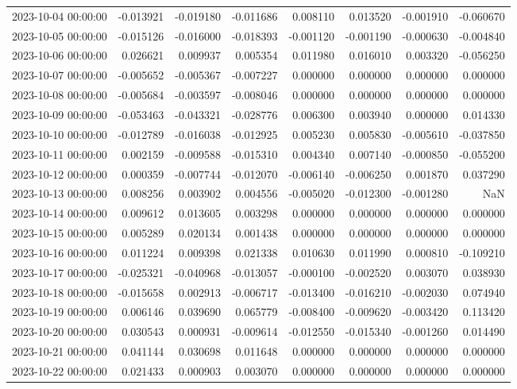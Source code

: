\begin{tabular}{lrrrrrrr}
2023-10-04 00:00:00 & -0.013921 & -0.019180 & -0.011686 & 0.008110 & 0.013520 & -0.001910 & -0.060670 \\
2023-10-05 00:00:00 & -0.015126 & -0.016000 & -0.018393 & -0.001120 & -0.001190 & -0.000630 & -0.004840 \\
2023-10-06 00:00:00 & 0.026621 & 0.009937 & 0.005354 & 0.011980 & 0.016010 & 0.003320 & -0.056250 \\
2023-10-07 00:00:00 & -0.005652 & -0.005367 & -0.007227 & 0.000000 & 0.000000 & 0.000000 & 0.000000 \\
2023-10-08 00:00:00 & -0.005684 & -0.003597 & -0.008046 & 0.000000 & 0.000000 & 0.000000 & 0.000000 \\
2023-10-09 00:00:00 & -0.053463 & -0.043321 & -0.028776 & 0.006300 & 0.003940 & 0.000000 & 0.014330 \\
2023-10-10 00:00:00 & -0.012789 & -0.016038 & -0.012925 & 0.005230 & 0.005830 & -0.005610 & -0.037850 \\
2023-10-11 00:00:00 & 0.002159 & -0.009588 & -0.015310 & 0.004340 & 0.007140 & -0.000850 & -0.055200 \\
2023-10-12 00:00:00 & 0.000359 & -0.007744 & -0.012070 & -0.006140 & -0.006250 & 0.001870 & 0.037290 \\
2023-10-13 00:00:00 & 0.008256 & 0.003902 & 0.004556 & -0.005020 & -0.012300 & -0.001280 & NaN \\
2023-10-14 00:00:00 & 0.009612 & 0.013605 & 0.003298 & 0.000000 & 0.000000 & 0.000000 & 0.000000 \\
2023-10-15 00:00:00 & 0.005289 & 0.020134 & 0.001438 & 0.000000 & 0.000000 & 0.000000 & 0.000000 \\
2023-10-16 00:00:00 & 0.011224 & 0.009398 & 0.021338 & 0.010630 & 0.011990 & 0.000810 & -0.109210 \\
2023-10-17 00:00:00 & -0.025321 & -0.040968 & -0.013057 & -0.000100 & -0.002520 & 0.003070 & 0.038930 \\
2023-10-18 00:00:00 & -0.015658 & 0.002913 & -0.006717 & -0.013400 & -0.016210 & -0.002030 & 0.074940 \\
2023-10-19 00:00:00 & 0.006146 & 0.039690 & 0.065779 & -0.008400 & -0.009620 & -0.003420 & 0.113420 \\
2023-10-20 00:00:00 & 0.030543 & 0.000931 & -0.009614 & -0.012550 & -0.015340 & -0.001260 & 0.014490 \\
2023-10-21 00:00:00 & 0.041144 & 0.030698 & 0.011648 & 0.000000 & 0.000000 & 0.000000 & 0.000000 \\
2023-10-22 00:00:00 & 0.021433 & 0.000903 & 0.003070 & 0.000000 & 0.000000 & 0.000000 & 0.000000 \\

\end{tabular}
